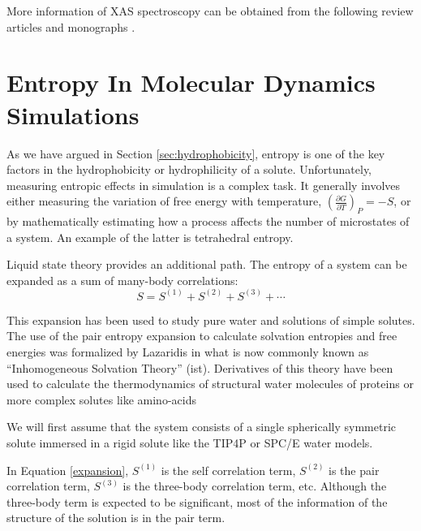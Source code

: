 More 
information of XAS spectroscopy 
can be obtained from the following 
review articles and monographs\cite{FEFF2_RevModPhys_Rehr_2000,JPhysChem_Palmer_1996,EXAFSreview, 
newville2004fundamentals,XASBook_Koningsberger_1988,AdelaCIC_v2}
. 


\section{Entropy In Molecular Dynamics Simulations}
As we have argued in Section \ref{sec:hydrophobicity}, entropy is one of the key factors in the 
hydrophobicity or 
hydrophilicity of a solute. 
Unfortunately, measuring entropic effects in simulation is a complex task. It generally involves 
either measuring the variation of free energy with temperature, $\left(\frac{\partial 
G}{\partial T}\right)_P=-S$, or by mathematically estimating how a process affects the number of 
microstates of 
a system. An example of the latter is tetrahedral entropy\cite{PNAS_Kumar_2009}.

Liquid state theory provides an additional path. The entropy of a system can be expanded as a 
sum of many-body 
correlations\cite{nettleton1958expression,baranyai1989direct}:
\begin{equation}\label{expansion}
S=S^{\left(1\right)}+S^{\left(2\right)}+S^{\left(3\right)}+\cdots
\end{equation}

This expansion has been used to study pure  
water\cite{Lazaridis1996,zielkiewicz2008two,Giuffre2010,Agarwal2011,Zhang2011} and solutions of 
simple 
solutes\cite{lazaridis1992entropy,lazaridis1994simulation,bergman1999topological,
lazaridis2000solvent,
kinoshita2006pair,liu2015order}. The use of the pair entropy expansion to calculate solvation 
entropies and 
free energies was formalized by Lazaridis in what is now commonly known as ``Inhomogeneous 
Solvation 
Theory'' 
(\gls{ist})\cite{lazaridis1998inhomogeneous}. Derivatives of this theory have been used to calculate the 
thermodynamics of structural water molecules of proteins\cite{li2012computing,Abel2008} or more 
complex solutes like amino-acids\cite{Nguyen2012,Huggins2013,Schauperl2016}

We will first assume that the system consists of a single spherically symmetric solute immersed in 
a rigid solute like the TIP4P\cite{TIP4P_JChemPhys_Jorgensen_1983} or 
SPC/E\cite{SPCE_JPhysChem_Berendsen_1987} water models.


In Equation \ref{expansion}, $S^{(1)}$  is the self correlation term, $S^{(2)}$  is the pair 
correlation term, $S^{(3)}$  
is the three-body correlation term, etc. Although the three-body term is expected to be 
significant, 
most of the information of the structure of the solution is in the pair 
term\cite{Lazaridis1996,nettleton1958expression,baranyai1989direct,wallace1987role}. 

